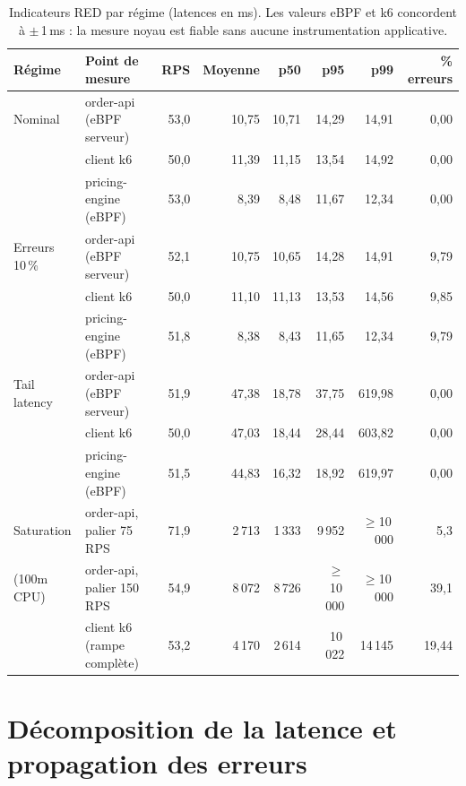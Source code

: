 \documentclass[10pt,a4paper]{article}
\begin{document}
\begin{table}[H]\centering\small
{}
\begin{tabular}{@{}llrrrrrr@{}}
\toprule
\textbf{Régime} & \textbf{Point de mesure} & \textbf{RPS} & \textbf{Moyenne} & \textbf{p50} & \textbf{p95} & \textbf{p99} & \textbf{\% erreurs} \\ \midrule
Nominal      & order-api (eBPF serveur)   & 53,0 & 10,75 & 10,71 & 14,29 & 14,91 & 0,00 \\
             & client k6                  & 50,0 & 11,39 & 11,15 & 13,54 & 14,92 & 0,00 \\
             & pricing-engine (eBPF)      & 53,0 &  8,39 &  8,48 & 11,67 & 12,34 & 0,00 \\ \midrule
Erreurs 10\,\% & order-api (eBPF serveur) & 52,1 & 10,75 & 10,65 & 14,28 & 14,91 & \textcolor{rouge}{9,79} \\
             & client k6                  & 50,0 & 11,10 & 11,13 & 13,53 & 14,56 & \textcolor{rouge}{9,85} \\
             & pricing-engine (eBPF)      & 51,8 &  8,38 &  8,43 & 11,65 & 12,34 & \textcolor{rouge}{9,79} \\ \midrule
Tail latency & order-api (eBPF serveur)   & 51,9 & 47,38 & 18,78 & 37,75 & \textcolor{rouge}{619,98} & 0,00 \\
             & client k6                  & 50,0 & 47,03 & 18,44 & 28,44 & \textcolor{rouge}{603,82} & 0,00 \\
             & pricing-engine (eBPF)      & 51,5 & 44,83 & 16,32 & 18,92 & \textcolor{rouge}{619,97} & 0,00 \\ \midrule
Saturation   & order-api, palier 75 RPS   & 71,9 & 2\,713 & 1\,333 & 9\,952 & $\geq$10\,000 & 5,3 \\
(100m CPU)   & order-api, palier 150 RPS  & 54,9 & 8\,072 & 8\,726 & $\geq$10\,000 & $\geq$10\,000 & \textcolor{rouge}{39,1} \\
             & client k6 (rampe complète) & 53,2 & 4\,170 & 2\,614 & 10\,022 & 14\,145 & \textcolor{rouge}{19,44} \\
\bottomrule
\end{tabular}
\caption{Indicateurs RED par régime (latences en ms). Les valeurs eBPF et k6 concordent à $\pm$\,1\,ms : la mesure noyau est fiable sans aucune instrumentation applicative.}
\end{table}

\section{Décomposition de la latence et propagation des erreurs}
\end{document}
